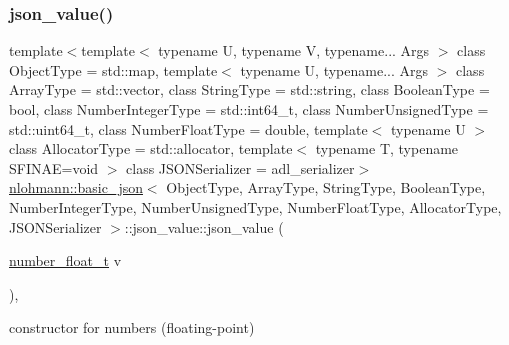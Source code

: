 \subsubsection{\texorpdfstring{json\+\_\+value()}{json\_value()}\hspace{0.1cm}{\footnotesize\ttfamily [5/12]}}
{\footnotesize\ttfamily template$<$template$<$ typename U, typename V, typename... Args $>$ class Object\+Type = std\+::map, template$<$ typename U, typename... Args $>$ class Array\+Type = std\+::vector, class String\+Type  = std\+::string, class Boolean\+Type  = bool, class Number\+Integer\+Type  = std\+::int64\+\_\+t, class Number\+Unsigned\+Type  = std\+::uint64\+\_\+t, class Number\+Float\+Type  = double, template$<$ typename U $>$ class Allocator\+Type = std\+::allocator, template$<$ typename T, typename S\+F\+I\+N\+A\+E=void $>$ class J\+S\+O\+N\+Serializer = adl\+\_\+serializer$>$ \\
\hyperlink{classnlohmann_1_1basic__json}{nlohmann\+::basic\+\_\+json}$<$ Object\+Type, Array\+Type, String\+Type, Boolean\+Type, Number\+Integer\+Type, Number\+Unsigned\+Type, Number\+Float\+Type, Allocator\+Type, J\+S\+O\+N\+Serializer $>$\+::json\+\_\+value\+::json\+\_\+value (\begin{DoxyParamCaption}\item[{\hyperlink{classnlohmann_1_1basic__json_a88d6103cb3620410b35200ee8e313d97}{number\+\_\+float\+\_\+t}}]{v }\end{DoxyParamCaption})\hspace{0.3cm}{\ttfamily [inline]}, {\ttfamily [noexcept]}}



constructor for numbers (floating-\/point) 

\mbox{\label{unionnlohmann_1_1basic__json_1_1json__value_a34114e47b2d6391ba97678cefef700c4}} 
